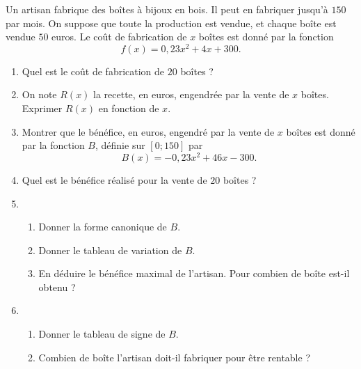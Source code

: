 \documentclass[11pt]{article}
\begin{document}
\begin{exo}[$6,5$ points]
  Un artisan fabrique des boîtes à bijoux en bois. Il peut en fabriquer jusqu'à
  $150$ par mois. On suppose que toute la production est vendue, et chaque boîte
  est vendue $50$ euros. Le coût de fabrication de $x$ boîtes est donné par la
  fonction 
  \[
    f(x) = 0,23x^2+4x+300.
  \]
  \begin{enumerate}
    \item Quel est le coût de fabrication de $20$ boîtes ?
    \item On note $R(x)$ la recette, en euros, engendrée par la vente de $x$
      boîtes. Exprimer $R(x)$ en fonction de $x$.
    \item Montrer que le bénéfice, en euros, engendré par la vente de $x$ boîtes
      est donné par la fonction $B$, définie sur $[0;150]$ par
      \[
        B(x) = -0,23x^2+46x-300.
      \]
    \item Quel est le bénéfice réalisé pour la vente de $20$ boîtes ?
    \item \begin{enumerate}
        \item Donner la forme canonique de $B$.
        \item Donner le tableau de variation de $B$.
        \item En déduire le bénéfice maximal de l'artisan. Pour combien de boîte
          est-il obtenu ?
      \end{enumerate}
    \item \begin{enumerate}
        \item Donner le tableau de signe de $B$.
        \item Combien de boîte l'artisan doit-il fabriquer pour être rentable ?
      \end{enumerate}
  \end{enumerate}
\end{exo}
\end{document}
